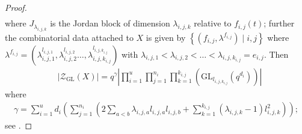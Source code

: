 \documentclass[11pt,twoside]{amsart}
\newcommand{\GL}{\mathrm{GL}}
\newcommand{\Zen}{\mathscr{Z}}
\theoremstyle{definition} %
\begin{document}
\begin{proof}
\begin{align*}
    \end{align*}
    where $J_{\lambda_{i,j,k}}$ is the Jordan block of dimension $\lambda_{i,j,k}$ relative to $f_{i,j}(t)$; further the combinatorial data attached to $X$ is given by $\left\{(f_{i,j},\lambda^{f_{i,j}})\mid i,j\right\}$ where $\lambda^{f_{i,j}}=\left(\lambda_{i,j,1}^{l_{i,j,1}},\lambda_{i,j,2}^{l_{i,j,2}}\ldots,\lambda_{i,j,k_{i,j}}^{l_{i,j,k_{i,j}}}\right)$ with $\lambda_{i,j,1}<\lambda_{i,j,2}<\ldots<\lambda_{i,j,k_{i,j}}=e_{i,j}$. 
    Then
    \begin{align*}
    &|\Zen_{\GL}(X)|=q^{\gamma} \left|
    \prod\limits_{i=1}^{u}
    \prod\limits_{j=1}^{n_i}
    \prod\limits_{k=1}^{k_{i,j}}
    \left(\GL_{l_{i,j,k_{i,j}}}(q^{d_i})\right)
    \right| 
    \end{align*}
    where 
    \begin{align*}
        \gamma=\sum\limits_{i=1}^{u}d_i\left(\sum\limits_{j=1}^{n_i}\left(2\sum\limits_{a<b}\lambda_{i,j,a}l_{i,j,a}l_{i,j,b}+\sum\limits_{k=1}^{k_{i,j}}(\lambda_{i,j,k}-1)l_{i,j,k}^2\right)\right);
    \end{align*}
    see \cite[Theorem 2.2.8]{FranceshiLiebeckOBrienBook}.


\end{proof}
\end{document}
